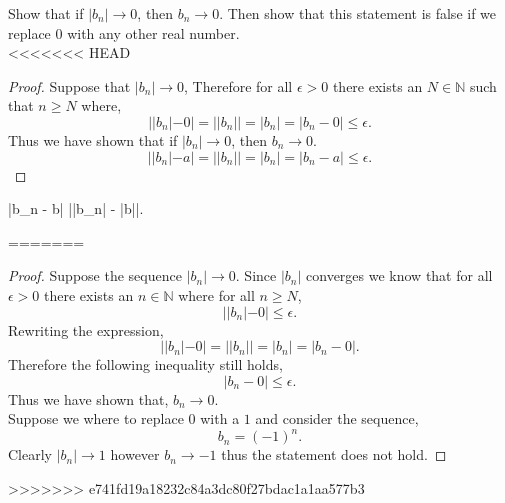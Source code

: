 \documentclass[12pt]{article}
\makeatletter
\theoremstyle{homework}
\newenvironment{exercise}[1]
{\def\@currentlabel{#1}\exercisecore}
{\endexercisecore}
\newcommand{\Nats}{\ensuremath{\mathbb N}}
\makeatother
\begin{document}
\begin{exercise}{Supplemental 3}
Show that if $|b_n|\to 0$, then $b_n\to 0$.
Then show that this statement is false if we replace $0$
with any other real number.\\
<<<<<<< HEAD
\begin{proof}
  Suppose that $|b_n|\to 0$, Therefore for all $\epsilon > 0$ there exists an $N \in \Nats$
  such that $n \geq N$ where,
  \begin{equation*}
    ||b_n| - 0| = ||b_n|| = |b_n| = |b_n - 0|  \le \epsilon.
  \end{equation*}
  Thus we have shown that if $|b_n|\to 0$, then $b_n\to 0$.
  \begin{equation*}
    ||b_n| - a| = ||b_n|| = |b_n| = |b_n - a|  \le \epsilon.
  \end{equation*}
\end{proof}



|b_n - b| \geq ||b_n| - |b||.


\end{exercise}












\begin{exercise}{2.3.10 (c)}
=======

\begin{proof}
  Suppose the sequence $|b_n|\to 0$. Since $|b_n|$ converges we know that for all $\epsilon > 0$ there exists an $n \in \Nats$
  where for all $n \geq N$,
  \begin{equation*}
    ||b_n| - 0| \le \epsilon.
  \end{equation*}
  Rewriting the expression,
  \begin{equation*}
    ||b_n| - 0| = ||b_n|| = |b_n| = |b_n - 0|.
  \end{equation*}
  Therefore the following inequality still holds,
  \begin{equation*}
    |b_n - 0| \le \epsilon.
  \end{equation*}
Thus we have shown that, $b_n\to 0$.\\

Suppose we where to replace $0$ with a $1$ and consider the sequence,
\begin{equation*}
  b_n = (-1)^n.
\end{equation*}
Clearly $|b_n|\to 1$ however $b_n\to -1$ thus the statement does not hold.
\end{proof}
>>>>>>> e741fd19a18232c84a3dc80f27bdac1a1aa577b3
\end{exercise}
\vspace{.5in}
\end{document}
